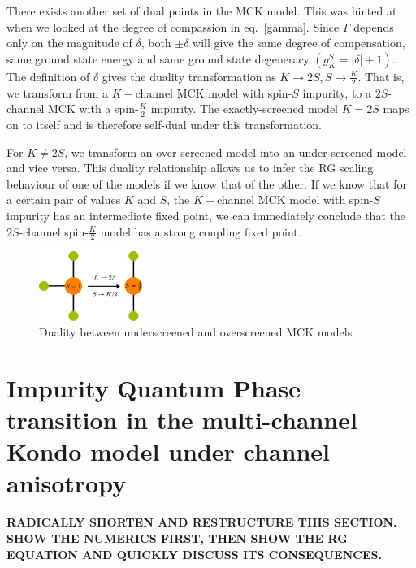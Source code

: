 \documentclass[reprint,prb,superscriptaddress]{revtex4-2}
\begin{document}
There exists another set of dual points in the MCK model. This was hinted at when we looked at the degree of compassion in eq.~\ref{gamma}. Since \(\Gamma\) depends only on the magnitude of \(\delta\), both \(\pm \delta\) will give the same degree of compensation, same ground state energy and same ground state degeneracy \(\left(g^S_K = |\delta|+1\right)\). The definition of \(\delta\) gives the duality transformation as \(K \to 2S, S \to \frac{K}{2}\). That is, we transform from a \(K-\)channel MCK model with spin-\(S\) impurity, to a \(2S\)-channel MCK with a spin-\(\frac{K}{2}\) impurity. The exactly-screened model \(K=2S\) maps on to itself and is therefore self-dual under this transformation.

For \(K \neq 2S\), we transform an over-screened model into an under-screened model and vice versa. This duality relationship allows us to infer the RG scaling behaviour of one of the models if we know that of the other. If we know that for a certain pair of values \(K\) and \(S\), the \(K-\)channel MCK model with spin-\(S\) impurity has an intermediate fixed point, we can immediately conclude that the \(2S\)-channel spin-\(\frac{K}{2}\) model has a strong coupling fixed point.
\begin{figure}[htpb]
	\centering
	\includegraphics[width=0.3\textwidth]{plt/duality2.pdf}
	\caption{Duality between underscreened and overscreened MCK models}
\end{figure}



\section{Impurity Quantum Phase transition in the multi-channel Kondo model under channel anisotropy}
\label{anisotropic_rg}
\textbf{RADICALLY SHORTEN AND RESTRUCTURE THIS SECTION. SHOW THE NUMERICS FIRST, THEN SHOW THE RG 
EQUATION AND QUICKLY DISCUSS ITS CONSEQUENCES.}
\end{document}
